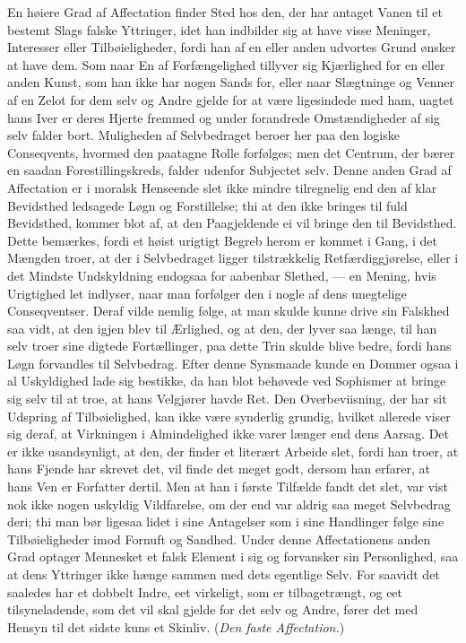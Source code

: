 \documentclass[12pt]{article}
\newcommand{\opage}[1]{\marginnote{\footnotesize\textit{[#1]}}}
\begin{document}
En høiere Grad af Affectation finder Sted hos den, der har antaget Vanen til et bestemt Slags falske Yttringer, idet han indbilder sig at have visse Meninger, Interesser eller Tilbøieligheder, fordi han af en eller anden udvortes Grund ønsker at have dem. Som naar En af Forfængelighed tillyver sig Kjærlighed for en eller anden Kunst, som han ikke har nogen Sands for, eller naar Slægtninge og Venner af en Zelot for dem selv og Andre gjelde for at være ligesindede med ham, uagtet hans Iver er deres Hjerte fremmed og under forandrede Omstændig\opage{171}heder af sig selv falder bort. Muligheden af Selvbedraget beroer her paa den logiske Conseqvents, hvormed den paatagne Rolle forfølges; men det Centrum, der bærer en saadan Forestillingskreds, falder udenfor Subjectet selv. Denne anden Grad af Affectation er i moralsk Henseende slet ikke mindre tilregnelig end den af klar Bevidsthed ledsagede Løgn og Forstillelse; thi at den ikke bringes til fuld Bevidsthed, kommer blot af, at den Paagjeldende ei vil bringe den til Bevidsthed. Dette bemærkes, fordi et høist urigtigt Begreb herom er kommet i Gang, i det Mængden troer, at der i Selvbedraget ligger tilstrækkelig Retfærdiggjørelse, eller i det Mindste Undskyldning endogsaa for aabenbar Slethed, --- en Mening, hvis Urigtighed let indlyser, naar man forfølger den i nogle af dens unegtelige Conseqventser. Deraf vilde nemlig følge, at man skulde kunne drive sin Falskhed saa vidt, at den igjen blev til Ærlighed, og at den, der lyver saa længe, til han selv troer sine digtede Fortællinger, paa dette Trin skulde blive bedre, fordi hans Løgn forvandles til Selvbedrag. Efter denne Synsmaade kunde en Dommer ogsaa i al Uskyldighed lade sig bestikke, da han blot behøvede ved Sophismer at bringe sig selv til at troe, at hans Velgjører havde Ret. Den Overbeviisning, der har sit Udspring af Tilbøielighed, kan ikke være synderlig grundig, hvilket allerede viser sig deraf, at Virkningen i Almindelighed ikke varer længer end dens Aarsag. Det er ikke usandsynligt, at den, der finder et literært Arbeide slet, fordi han troer, at hans Fjende har skrevet det, vil finde det meget godt, dersom han erfarer, at hans Ven er Forfatter dertil. Men at han i første Tilfælde fandt det slet, var vist nok ikke nogen uskyldig Vildfarelse, om der end var aldrig saa meget Selvbedrag deri; thi man bør ligesaa lidet i sine Antagelser som i sine Handlinger følge sine Tilbøieligheder imod Fornuft og Sandhed. Under denne Affectationens anden Grad optager Mennesket et falsk Element i sig og forvansker sin Personlighed, saa \opage{172}at dens Yttringer ikke hænge sammen med dets egentlige Selv. For saavidt det saaledes har et dobbelt Indre, eet virkeligt, som er tilbagetrængt, og eet tilsyneladende, som det vil skal gjelde for det selv og Andre, fører det med Hensyn til det sidste kuns et Skinliv. (\emph{Den faste Affectation.})
\end{document}
